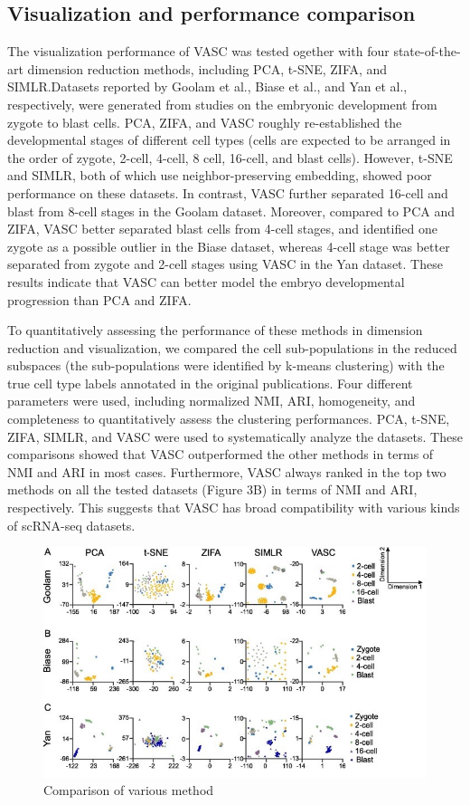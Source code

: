 \documentclass[12 pts]{article}
\begin{document}
\subsection{Visualization and performance comparison}
The visualization performance of VASC was tested ogether with four state-of-the-art dimension reduction methods, including PCA, t-SNE, ZIFA, and SIMLR.Datasets reported by Goolam et al., Biase et al., and Yan et al., respectively, were generated from studies on the embryonic development from zygote to blast cells. PCA, ZIFA, and VASC roughly re-established the developmental stages of different cell types (cells are expected to be arranged in the order of zygote, 2-cell, 4-cell, 8 cell, 16-cell, and blast cells). However, t-SNE and SIMLR, both of which use neighbor-preserving embedding, showed poor performance on these datasets. In contrast, VASC further separated 16-cell and blast from 8-cell stages in the Goolam dataset. Moreover, compared to PCA and ZIFA, VASC better separated blast cells from 4-cell stages, and identified one zygote as a possible outlier in the Biase dataset, whereas 4-cell stage was better separated from zygote and 2-cell stages using VASC in the Yan dataset. These results indicate that VASC can better model the embryo developmental progression than PCA and ZIFA.

To quantitatively assessing the performance of these methods in dimension reduction and visualization, we compared the cell sub-populations in the reduced subspaces (the sub-populations were identified by k-means clustering) with the true cell type labels annotated in the original publications. Four different parameters were used, including normalized NMI, ARI, homogeneity, and completeness to quantitatively assess the clustering performances. PCA, t-SNE, ZIFA, SIMLR, and VASC were used to systematically analyze the datasets. These comparisons showed that VASC outperformed the other methods in terms of NMI and ARI in most cases. Furthermore, VASC always ranked in the top two methods on all the tested datasets (Figure 3B) in terms of NMI and ARI, respectively. This suggests that VASC has broad compatibility with various kinds of scRNA-seq datasets.

\begin{figure}[H]
\centering
\includegraphics[scale=0.9]{Compare}
\caption{Comparison of various method}
\label{fig: Compare}
\end{figure}
\end{document}
